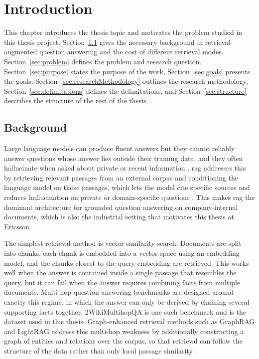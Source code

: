 \documentclass[english, bibtex]{kththesis}               %
\numberwithin{listing}{chapter}
\begin{document}
\label{pg:lastPageofPreface}
\mainmatter
\glsresetall
\renewcommand{\chaptermark}[1]{\markboth{#1}{}}
\chapter{Introduction}
\label{ch:introduction}

This chapter introduces the thesis topic and motivates the problem studied in this thesis project. Section~\ref{sec:background} gives the necessary background in retrieval-augmented question answering and the cost of different retrieval modes. Section~\ref{sec:problem} defines the problem and research question. Section~\ref{sec:purpose} states the purpose of the work, Section~\ref{sec:goals} presents the goals, Section~\ref{sec:researchMethodology} outlines the research methodology, Section~\ref{sec:delimitations} defines the delimitations, and Section~\ref{sec:structure} describes the structure of the rest of the thesis.

\section{Background}
\label{sec:background}

Large language models can produce fluent answers but they cannot reliably answer questions whose answer lies outside their training data, and they often hallucinate when asked about private or recent information \cite{gao2023ragsurvey}. \Gls{rag} addresses this by retrieving relevant passages from an external corpus and conditioning the language model on those passages, which lets the model cite specific sources and reduces hallucination on private or domain-specific questions \cite{gao2023ragsurvey,lewis2020rag}. This makes \gls{rag} the dominant architecture for grounded question answering on company-internal documents, which is also the industrial setting that motivates this thesis at Ericsson.

The simplest retrieval method is vector similarity search. Documents are split into chunks, each chunk is embedded into a vector space using an embedding model, and the chunks closest to the query embedding are retrieved. This works well when the answer is contained inside a single passage that resembles the query, but it can fail when the answer requires combining facts from multiple documents. Multi-hop question answering benchmarks are designed around exactly this regime, in which the answer can only be derived by chaining several supporting facts together. 2WikiMultihopQA \cite{ho2020twowiki} is one such benchmark and is the dataset used in this thesis. Graph-enhanced retrieval methods such as GraphRAG and LightRAG address this multi-hop weakness by additionally constructing a graph of entities and relations over the corpus, so that retrieval can follow the structure of the data rather than only local passage similarity \cite{edge2024graphrag,lightrag2024}.
\end{document}
